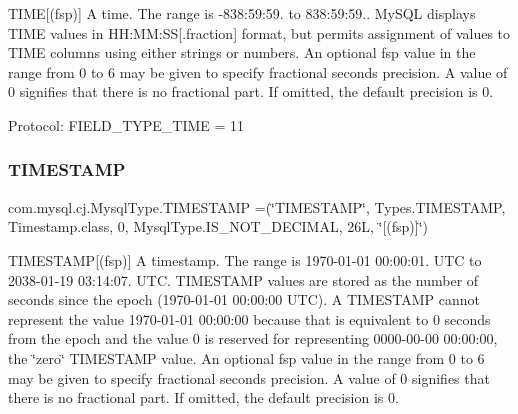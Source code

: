 T\+I\+ME\mbox{[}(fsp)\mbox{]} A time. The range is \textquotesingle{}-\/838\+:59\+:59.\textquotesingle{} to \textquotesingle{}838\+:59\+:59.\textquotesingle{}. My\+S\+QL displays T\+I\+ME values in \textquotesingle{}H\+H\+:\+MM\+:SS\mbox{[}.fraction\mbox{]}\textquotesingle{} format, but permits assignment of values to T\+I\+ME columns using either strings or numbers. An optional fsp value in the range from 0 to 6 may be given to specify fractional seconds precision. A value of 0 signifies that there is no fractional part. If omitted, the default precision is 0.

Protocol\+: F\+I\+E\+L\+D\+\_\+\+T\+Y\+P\+E\+\_\+\+T\+I\+ME = 11 \mbox{\label{enumcom_1_1mysql_1_1cj_1_1_mysql_type_a8d26bb8a1cf3f337d3294ff11f50c5ae}} 
\subsubsection{\texorpdfstring{T\+I\+M\+E\+S\+T\+A\+MP}{TIMESTAMP}}
{\footnotesize\ttfamily com.\+mysql.\+cj.\+Mysql\+Type.\+T\+I\+M\+E\+S\+T\+A\+MP =(\char`\"{}T\+I\+M\+E\+S\+T\+A\+MP\char`\"{}, Types.\+T\+I\+M\+E\+S\+T\+A\+MP, Timestamp.\+class, 0, Mysql\+Type.\+I\+S\+\_\+\+N\+O\+T\+\_\+\+D\+E\+C\+I\+M\+AL, 26\+L, \char`\"{}\mbox{[}(fsp)\mbox{]}\char`\"{})}

T\+I\+M\+E\+S\+T\+A\+MP\mbox{[}(fsp)\mbox{]} A timestamp. The range is \textquotesingle{}1970-\/01-\/01 00\+:00\+:01.\textquotesingle{} U\+TC to \textquotesingle{}2038-\/01-\/19 03\+:14\+:07.\textquotesingle{} U\+TC. T\+I\+M\+E\+S\+T\+A\+MP values are stored as the number of seconds since the epoch (\textquotesingle{}1970-\/01-\/01 00\+:00\+:00\textquotesingle{} U\+TC). A T\+I\+M\+E\+S\+T\+A\+MP cannot represent the value \textquotesingle{}1970-\/01-\/01 00\+:00\+:00\textquotesingle{} because that is equivalent to 0 seconds from the epoch and the value 0 is reserved for representing \textquotesingle{}0000-\/00-\/00 00\+:00\+:00\textquotesingle{}, the \char`\"{}zero\char`\"{} T\+I\+M\+E\+S\+T\+A\+MP value. An optional fsp value in the range from 0 to 6 may be given to specify fractional seconds precision. A value of 0 signifies that there is no fractional part. If omitted, the default precision is 0.

